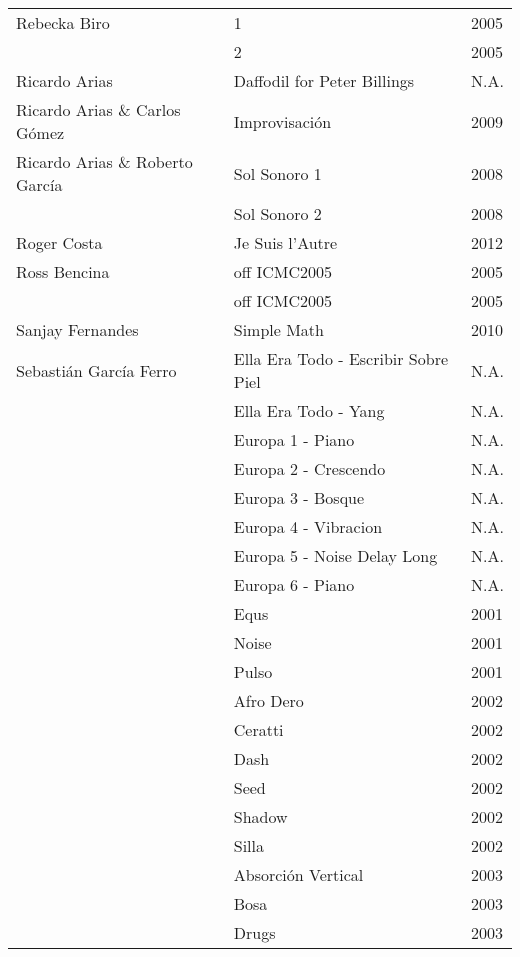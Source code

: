 \begin{center}
\begin{longtable}{ p{}  p{}  p{} }
Rebecka Biro & 1 & 2005 \\ \cmidrule (r){2-3} 
& 2 & 2005 \\ \midrule 
Ricardo Arias &  Daffodil for Peter Billings & N.A. \\ \midrule
Ricardo Arias \& Carlos Gómez & Improvisación & 2009 \\ \midrule
Ricardo Arias \& Roberto García & Sol Sonoro 1 & 2008 \\ \cmidrule (r){2-3} 
& Sol Sonoro 2 & 2008 \\ \midrule 
Roger Costa & Je Suis l'Autre & 2012 \\ \midrule 
Ross Bencina & off ICMC2005 & 2005 \\ \cmidrule (r){2-3} 
& off ICMC2005 & 2005 \\ \midrule 
Sanjay Fernandes & Simple Math & 2010 \\ \midrule 
Sebastián García Ferro & Ella Era Todo - Escribir Sobre Piel & N.A. \\ \cmidrule (r){2-3} 
& Ella Era Todo - Yang & N.A. \\ \cmidrule (r){2-3} 
& Europa 1 - Piano & N.A. \\ \cmidrule (r){2-3} 
& Europa 2 - Crescendo & N.A. \\ \cmidrule (r){2-3} 
& Europa 3 - Bosque & N.A. \\ \cmidrule (r){2-3} 
& Europa 4 - Vibracion & N.A. \\ \cmidrule (r){2-3} 
& Europa 5 - Noise Delay Long & N.A. \\ \cmidrule (r){2-3} 
& Europa 6 - Piano & N.A. \\ \cmidrule (r){2-3} 
& Equs & 2001 \\ \cmidrule (r){2-3} 
& Noise & 2001 \\ \cmidrule (r){2-3} 
& Pulso & 2001 \\ \cmidrule (r){2-3} 
& Afro Dero & 2002 \\ \cmidrule (r){2-3} 
& Ceratti & 2002 \\ \cmidrule (r){2-3} 
& Dash & 2002 \\ \cmidrule (r){2-3} 
& Seed & 2002 \\ \cmidrule (r){2-3} 
& Shadow & 2002 \\ \cmidrule (r){2-3} 
& Silla & 2002 \\ \cmidrule (r){2-3} 
& Absorción Vertical & 2003 \\ \cmidrule (r){2-3} 
& Bosa & 2003 \\ \cmidrule (r){2-3} 
& Drugs & 2003 \\ \cmidrule (r){2-3} 

\end{longtable}
\end{center}
